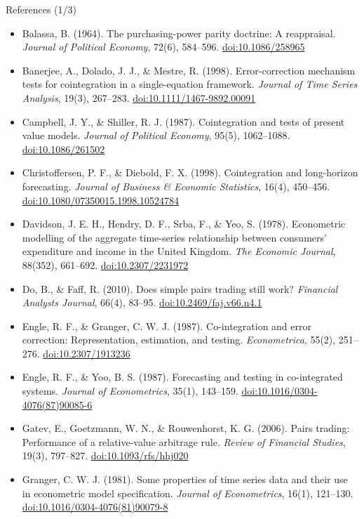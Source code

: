 \begin{frame}{References (1/3)}
\itemsize{\scriptsize}
\begin{itemize}
    \item Balassa, B. (1964). The purchasing-power parity doctrine: A reappraisal. \textit{Journal of Political Economy}, 72(6), 584--596. \href{https://doi.org/10.1086/258965}{doi:10.1086/258965}
    \item Banerjee, A., Dolado, J. J., \& Mestre, R. (1998). Error-correction mechanism tests for cointegration in a single-equation framework. \textit{Journal of Time Series Analysis}, 19(3), 267--283. \href{https://doi.org/10.1111/1467-9892.00091}{doi:10.1111/1467-9892.00091}
    \item Campbell, J. Y., \& Shiller, R. J. (1987). Cointegration and tests of present value models. \textit{Journal of Political Economy}, 95(5), 1062--1088. \href{https://doi.org/10.1086/261502}{doi:10.1086/261502}
    \item Christoffersen, P. F., \& Diebold, F. X. (1998). Cointegration and long-horizon forecasting. \textit{Journal of Business \& Economic Statistics}, 16(4), 450--456. \href{https://doi.org/10.1080/07350015.1998.10524784}{doi:10.1080/07350015.1998.10524784}
    \item Davidson, J. E. H., Hendry, D. F., Srba, F., \& Yeo, S. (1978). Econometric modelling of the aggregate time-series relationship between consumers' expenditure and income in the United Kingdom. \textit{The Economic Journal}, 88(352), 661--692. \href{https://doi.org/10.2307/2231972}{doi:10.2307/2231972}
    \item Do, B., \& Faff, R. (2010). Does simple pairs trading still work? \textit{Financial Analysts Journal}, 66(4), 83--95. \href{https://doi.org/10.2469/faj.v66.n4.1}{doi:10.2469/faj.v66.n4.1}
    \item Engle, R. F., \& Granger, C. W. J. (1987). Co-integration and error correction: Representation, estimation, and testing. \textit{Econometrica}, 55(2), 251--276. \href{https://doi.org/10.2307/1913236}{doi:10.2307/1913236}
    \item Engle, R. F., \& Yoo, B. S. (1987). Forecasting and testing in co-integrated systems. \textit{Journal of Econometrics}, 35(1), 143--159. \href{https://doi.org/10.1016/0304-4076(87)90085-6}{doi:10.1016/0304-4076(87)90085-6}
    \item Gatev, E., Goetzmann, W. N., \& Rouwenhorst, K. G. (2006). Pairs trading: Performance of a relative-value arbitrage rule. \textit{Review of Financial Studies}, 19(3), 797--827. \href{https://doi.org/10.1093/rfs/hhj020}{doi:10.1093/rfs/hhj020}
    \item Granger, C. W. J. (1981). Some properties of time series data and their use in econometric model specification. \textit{Journal of Econometrics}, 16(1), 121--130. \href{https://doi.org/10.1016/0304-4076(81)90079-8}{doi:10.1016/0304-4076(81)90079-8}
\end{itemize}
\end{frame}

